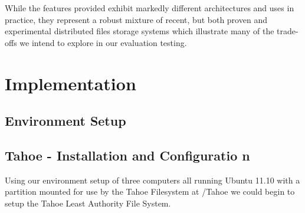 \documentclass[11pt]{article}
\begin{document}
While the features provided exhibit markedly different architectures and 
uses in practice, they represent a robust mixture of recent, but both 
proven and experimental distributed files storage systems which illustrate 
many of the trade-offs we intend to explore in our evaluation testing.


\section{Implementation}

\subsection{Environment Setup}


\subsection{Tahoe - Installation and Configuratio n}
Using our environment setup of three computers all running Ubuntu 11.10 with a partition mounted for use by the Tahoe Filesystem at /Tahoe we could begin to setup the Tahoe Least Authority File System. 
\end{document}
